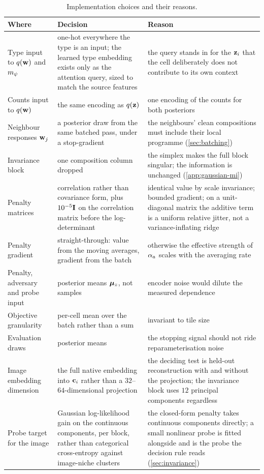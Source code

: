 \begin{table}[t]
\centering
\caption{Implementation choices and their reasons.}
\label{tab:deviations}
\small
\begin{tabular}{@{}p{}p{}p{}@{}}
\toprule
Where & Decision & Reason \\
\midrule
Type input to $q(\mathbf{w})$ and $m_{\psi}$ & one-hot everywhere the type is an input; the learned type embedding exists only as the attention query, sized to match the source features & the query stands in for the $\mathbf{z}_i$ that the cell deliberately does not contribute to its own context \\
Counts input to $q(\mathbf{w})$ & the same encoding as $q(\mathbf{z})$ & one encoding of the counts for both posteriors \\
Neighbour responses $\mathbf{w}_j$ & a posterior draw from the same batched pass, under a stop-gradient & the neighbours' clean compositions must include their local programme (\cref{sec:batching}) \\
Invariance block & one composition column dropped & the simplex makes the full block singular; the information is unchanged (\cref{app:gaussian-mi}) \\
Penalty matrices & correlation rather than covariance form, plus $10^{-5}\mathbf{I}$ on the correlation matrix before the log-determinant & identical value by scale invariance; bounded gradient; on a unit-diagonal matrix the additive term is a uniform relative jitter, not a variance-inflating ridge \\
Penalty gradient & straight-through: value from the moving averages, gradient from the batch & otherwise the effective strength of $\alpha_a$ scales with the averaging rate \\
Penalty, adversary and probe input & posterior means $\boldsymbol{\mu}_z$, not samples & encoder noise would dilute the measured dependence \\
Objective granularity & per-cell mean over the batch rather than a sum & invariant to tile size \\
Evaluation draws & posterior means & the stopping signal should not ride reparameterisation noise \\
Image embedding dimension & the full native embedding into $\mathbf{c}_i$ rather than a $32$--$64$-dimensional projection & the deciding test is held-out reconstruction with and without the projection; the invariance block uses $12$ principal components regardless \\
Probe target for the image & Gaussian log-likelihood gain on the continuous components, per block, rather than categorical cross-entropy against image-niche clusters & the closed-form penalty takes continuous components directly; a small nonlinear probe is fitted alongside and is the probe the decision rule reads (\cref{sec:invariance}) \\

\end{tabular}
\end{table}
